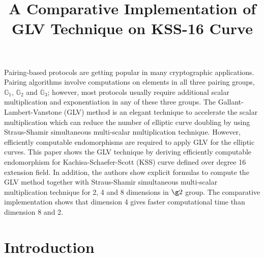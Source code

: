 
\title{A Comparative Implementation of GLV Technique on KSS-16 Curve}

Pairing-based protocols are getting popular in many cryptographic applications. 
Pairing algorithms involve computations on elements in all three pairing groups, $\mathbb{G}_1$, $\mathbb{G}_2$ and $\mathbb{G}_3$; however, most protocols usually require additional scalar multiplication and exponentiation in any of these three groups. 
The Gallant-Lambert-Vanstone (GLV) method is an elegant technique to accelerate the scalar multiplication which can reduce the number of elliptic curve doubling by using Straus-Shamir simultaneous multi-scalar multiplication technique.
However, efficiently computable endomorphisms are required to apply GLV for the elliptic curves. 
This paper shows the GLV technique by deriving efficiently computable endomorphism for Kachisa-Schaefer-Scott (KSS) curve defined over degree 16 extension field.
In addition, the authors show explicit formulas to compute the GLV method together with Straus-Shamir simultaneous multi-scalar multiplication technique for 2, 4 and 8 dimensions in $\g2$ group. 
The comparative implementation shows that dimension 4 gives faster computational time than dimension 8 and 2. 

\section{Introduction}

